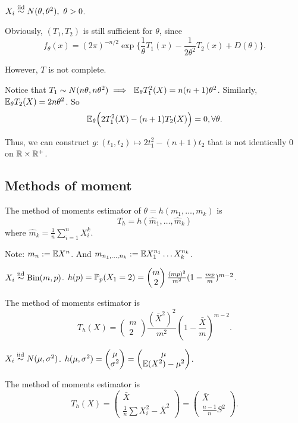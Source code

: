 \begin{exap}
	$X_i \SimIID N(\theta, \theta^2),\ \theta>0$.
	
	Obviously, $(T_1, T_2)$ is still sufficient for $\theta$, since 
	$$f_\theta (x) = (2\pi)^{-n/2} \exp \Big \{  \frac{1}{\theta} T_1(x)  - \frac{1}{2\theta^2} T_2(x) + D(\theta) \Big \} .$$
	
	However, $T$ is not complete. 
	
	Notice that $T_1 \sim N(n\theta, n \theta^2) \implies\ \mathbb{E}_\theta T^2_1(X) = n(n+1) \theta^2$. Similarly, $\mathbb{E}_\theta T_2(X) = 2n \theta^2$. So
	$$\mathbb{E}_\theta \Big(2 T_1^2(X) - (n+1)T_2 (X) \Big)= 0, \forall \theta.$$
	
	Thus, we can construct $g: (t_1, t_2) \mapsto 2t_1^2 - (n+1)t_2$ that is not identically $0$ on $\mathbb{R} \times \mathbb{R}^+$. 
\end{exap}



\subsection{Methods of moment}
\begin{mydef}
	The method of moments estimator of $\theta = h(m_1, \dots, m_k)$ is 
	$$T_h = h(\hat{m}_1, \dots, \hat{m}_k)$$
	where $\hat{m}_k = \frac{1}{n}\sum_{i=1}^n X_i^k$.
\end{mydef}
\begin{remark}
	Note: $m_n := \mathbb{E} X^n$. And $m_{n_1,\dots,n_k}:= \mathbb{E} X_1^{n_1} \dots X_k^{n_k}$.
\end{remark}

\begin{exap}
	$X_i \stackrel{\text{iid}}{\sim} \mathrm{Bin}(m,p)$. $h(p) = \mathbb{P}_p(X_1 = 2) = \begin{pmatrix}
	m\\
	2
	\end{pmatrix} \frac{(mp)^2}{m^2} (1-\frac{mp}{m})^{m-2}$. 
	
	The method of moments estimator is 
	$$T_h(X) = \begin{pmatrix}
	m\\
	2
	\end{pmatrix} \frac{(\bar{X}^2)^2}{m^2} (1-\frac{\bar{X}}{m})^{m-2}.$$
\end{exap}

\begin{exap}
	$X_i \stackrel{\text{iid}}{\sim} N(\mu, \sigma^2)$. $h(\mu, \sigma^2) = \begin{pmatrix}
	\mu \\
	\sigma^2
	\end{pmatrix} = \begin{pmatrix}
	\mu \\
	\mathbb{E}(X^2) - \mu^2
	\end{pmatrix} $.
	
	The method of moments estimator is $$T_h(X) = \begin{pmatrix}
	\bar{X} \\
	\frac{1}{n}\sum X_i^2 - \bar{X}^2
	\end{pmatrix} = \begin{pmatrix}
	\bar{X} \\
	\frac{n-1}{n} S^2
	\end{pmatrix} .$$
\end{exap}